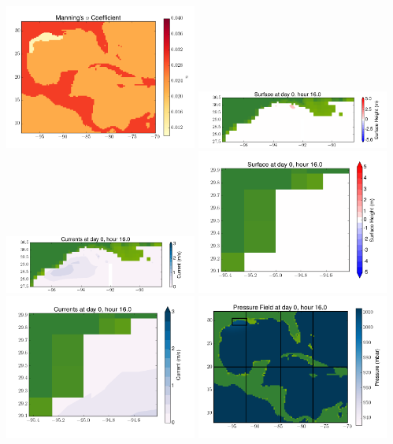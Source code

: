 \documentclass[11pt]{article}
\begin{document}
\vskip 10pt 
\includegraphics[width=0.475\textwidth]{frame0088fig3.png}
\includegraphics[width=0.475\textwidth]{frame0088fig4.png}
\vskip 10pt 
\includegraphics[width=0.475\textwidth]{frame0088fig5.png}
\includegraphics[width=0.475\textwidth]{frame0088fig6.png}
\vskip 10pt 
\includegraphics[width=0.475\textwidth]{frame0088fig7.png}
\includegraphics[width=0.475\textwidth]{frame0088fig8.png}
\end{document}
